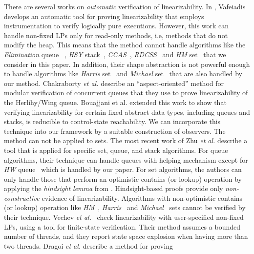 There are several works on {\it automatic} verification of linearizability.
%
In \cite{Vafeiadis:cav10}, Vafeiadis
develops an automatic tool for proving  linearizability that
employs instrumentation to verify logically pure executions.
%
However, this work can handle non-fixed LPs only for read-only methods,
i.e, methods that do not modify the heap.
%
This means that the method cannot handle
 algorithms like the {\it Elimination} queue ~\cite{Shavit:ElimQueue}, {\it HSY} stack~\cite{HSYstack}, {\it CCAS}~\cite{Harris:CAS}, 
{\it RDCSS}~\cite{Harris:CAS} and {\it HM} set~\cite{ArtOfMpP} that we consider in this paper. In addition, their shape abstraction is not powerful enough to handle algorithms like {\it Harris} set~\cite{Harris:list} and {\it Michael} set~\cite{Michael:list} that are also handled by our method.
%
%
Chakraborty {\it et al.} \cite{HSV:concur13}
describe an ``aspect-oriented'' method for  modular verification 
of concurrent queues that they use to prove linearizability of the Herlihy/Wing queue.
Bouajjani et al. \cite{BEEH:icalp15} extended this work to show that verifying 
linearizability for certain
fixed abstract data types, including queues and stacks, is reducible to 
control-state reachability. 
%
We can incorporate this technique into
our framework by a suitable construction of observers.
The method can not be applied to sets.
%
The most recent work of Zhu {\it et al.} \cite{Poling}
describe a tool that is applied for specific set, queue, and stack  
algorithms. For queue algorithms, their technique can handle queues with helping mechanism except for {\it HW} queue~\cite{HeWi:linearizability} which is handled by our paper.
%
For set algorithms, the authors can only handle those that perform an optimistic contains (or lookup) operation by applying the {\it hindsight lemma} from 
\cite{OHearnlist}. 
%
Hindsight-based proofs provide only {\it non-constructive} 
evidence of linearizability. Algorithms with non-optimistic contains (or lookup) operation like {\it HM}~\cite{ArtOfMpP}, {\it Harris}~\cite{Harris:list} and {\it Michael}~\cite{Michael:list} sets cannot be verified by their technique.  
%
Vechev {\it et al.}~\cite{Vechev:spin09}
check linearizability with user-specified non-fixed LPs,
using a tool for finite-state verification.
Their method assumes a bounded number of threads, and
they report state space explosion when having more than two threads.
%
Dragoi  {\it et al.} \cite{Henzinger:CAV13} describe a method for proving
